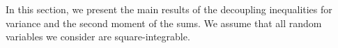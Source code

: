 \documentclass[ECP]{ejpecp} %
\newcommand{\G}{\mathcal{G}}
\newcommand{\lpar}{\left(}
\newcommand{\rpar}{\right)}
\newcommand{\lbr}{\left[}
\newcommand{\rbr}{\right]}
\newcommand{\E}{\mathbb{E}}
\newcommand{\sumn}{\sum\limits_{i=1}^n}
\newcommand{\var}{\mathbb{V}ar}
\begin{document}
In this section, we present the main results of the decoupling inequalities for variance and the second moment of the sums. We assume that all random variables we consider are square-integrable. 




\end{document}
